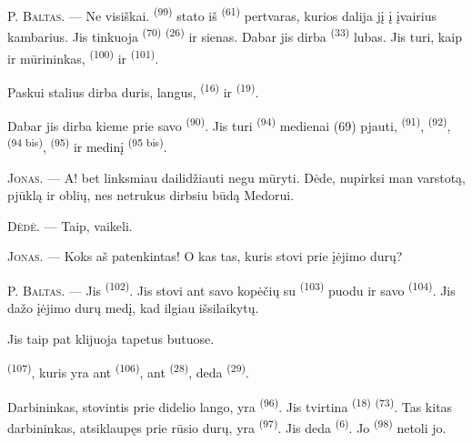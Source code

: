 P. \textsc{Baltas}. --- Ne visiškai.  \textsuperscript{(99)}
stato iš  \textsuperscript{(61)} pertvaras, kurios dalija jį į
įvairius kambarius. Jis tinkuoja  \textsuperscript{(70)}
 \textsuperscript{(26)} ir sienas. Dabar jis dirba 
\textsuperscript{(33)} lubas. Jis turi, kaip ir mūrininkas, 
\textsuperscript{(100)} ir  \textsuperscript{(101)}.

Paskui stalius dirba duris, langus,  \textsuperscript{(16)} ir
 \textsuperscript{(19)}.

Dabar jis dirba kieme prie savo  \textsuperscript{(90)}. Jis turi
 \textsuperscript{(94)} medienai (69) pjauti, 
\textsuperscript{(91)},  \textsuperscript{(92)}, 
\textsuperscript{(94 bis)},  \textsuperscript{(95)} ir medinį
 \textsuperscript{(95 bis)}.

\textsc{Jonas}. --- A! bet linksmiau dailidžiauti negu mūryti. Dėde, nupirksi man
varstotą, pjūklą ir oblių, nes netrukus dirbsiu būdą Medorui.

\textsc{Dėdė}. --- Taip, vaikeli.

\textsc{Jonas}. --- Koks aš patenkintas! O kas tas, kuris stovi prie įėjimo durų?

\VUsaut{3.0mm}
\VUsaut{3.0mm}

P. \textsc{Baltas}. --- Jis  \textsuperscript{(102)}. Jis stovi ant
savo kopėčių su  \textsuperscript{(103)} puodu ir savo 
\textsuperscript{(104)}. Jis dažo įėjimo durų medį, kad ilgiau išsilaikytų.

Jis taip pat klijuoja tapetus butuose.

 \textsuperscript{(107)}, kuris yra ant 
\textsuperscript{(106)}, ant  \textsuperscript{(28)}, deda
 \textsuperscript{(29)}.

Darbininkas, stovintis prie didelio lango, yra 
\textsuperscript{(96)}. Jis tvirtina  \textsuperscript{(18)}
 \textsuperscript{(73)}. Tas kitas darbininkas, atsiklaupęs prie rūsio
durų, yra  \textsuperscript{(97)}. Jis deda 
\textsuperscript{(6)}. Jo  \textsuperscript{(98)} netoli jo.

